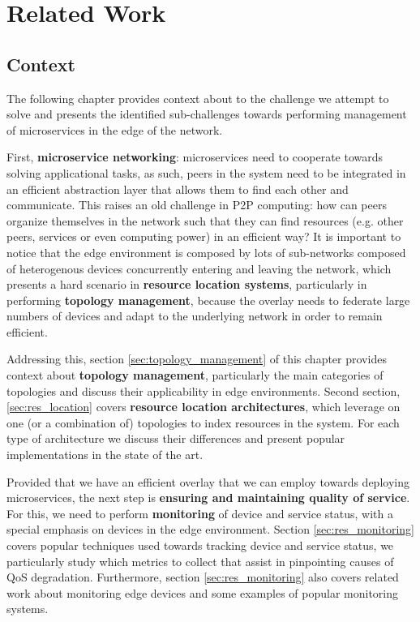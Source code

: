 \chapter{Related Work} \label{cha:related_work}

\section{Context}

The following chapter provides context about to the challenge we attempt to solve and presents the identified sub-challenges towards performing management of microservices in the edge of the network. 

First, \textbf{microservice networking}: microservices need to cooperate towards solving applicational tasks, as such, peers in the system need to be integrated in an efficient abstraction layer that allows them to find each other and communicate. This raises an old challenge in P2P computing: how can peers organize themselves in the network such that they can find resources (e.g. other peers, services or even computing power) in an efficient way? It is important to notice that the edge environment is composed by lots of sub-networks composed of heterogenous devices concurrently entering and leaving the network, which presents a hard scenario in \textbf{resource location systems}, particularly in performing \textbf{topology management}, because the overlay needs to federate large numbers of devices and adapt to the underlying network in order to remain efficient. 

Addressing this, section \ref{sec:topology_management} of this chapter provides context about \textbf{topology management}, particularly the main categories of topologies and discuss their applicability in edge environments. Second section, \ref{sec:res_location} covers \textbf{resource location architectures}, which leverage on one (or a combination of) topologies to index resources in the system. For each type of architecture we discuss their differences and present popular implementations in the state of the art. 

Provided that we have an efficient overlay that we can employ towards deploying microservices, the next step is \textbf{ensuring and maintaining quality of service}. For this, we need to perform \textbf{monitoring} of device and service status, with a special emphasis on devices in the edge environment. Section \ref{sec:res_monitoring} covers popular techniques used towards tracking device and service status, we particularly study which metrics to collect that assist in pinpointing causes of QoS degradation. Furthermore, section \ref{sec:res_monitoring} also covers related work about monitoring edge devices and some examples of popular monitoring systems.

